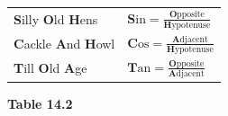 {{\begin{center}
\begin{xtabular}[t]{|l|l|}
    
        \textbf{S}illy \textbf{O}ld \textbf{H}ens &
    
    
        
                  \begin{math}\mathbf{S}\mathrm{in}=\frac{\mathbf{O}\mathrm{pposite}}{\mathbf{H}\mathrm{ypotenuse}}\end{math}
     \tabularnewline{}
    
    
        \textbf{C}ackle \textbf{A}nd \textbf{H}owl &
    
    
        
                  \begin{math}\mathbf{C}\mathrm{os}=\frac{\mathbf{A}\mathrm{djacent}}{\mathbf{H}\mathrm{ypotenuse}}\end{math}
     \tabularnewline{}
    
    
        \textbf{T}ill \textbf{O}ld \textbf{A}ge &
    
    
        
                  \begin{math}\mathbf{T}\mathrm{an}=\frac{\mathbf{O}\mathrm{pposite}}{\mathbf{A}\mathrm{djacent}}\end{math}
     \tabularnewline{}
    \end{xtabular}
      \end{center}
    \begin{center}{\small\bfseries Table 14.2}\end{center}
    
}}

